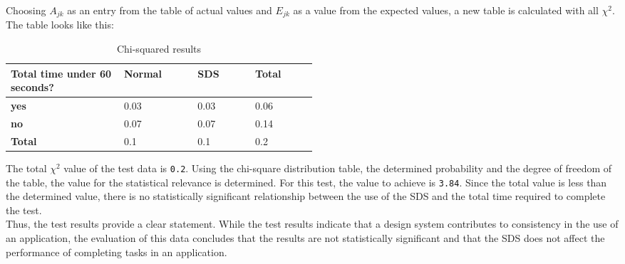 Choosing $A_{jk}$ as an entry from the table of actual values and $E_{jk}$ as a value from the expected values, a new table is calculated with all $\chi^2$. The table looks like this:
\begin{table}[ht]
    \centering
    \begin{tabular}{|p{0.2\linewidth} || p{0.1\linewidth}|p{0.1\linewidth}|p{0.1\linewidth}|}
        \hline
        \textbf{Total time under 60 seconds?} &\textbf{Normal}&\textbf{\ac{SDS}}&\textbf{Total} \\ \hline\hline
        \textbf{yes} & 0.03 & 0.03 & 0.06 \\ \hline
        \textbf{no} & 0.07 & 0.07 & 0.14 \\ \hline
        \textbf{Total} & 0.1 & 0.1 & 0.2 \\ \hline
    \end{tabular}
    \caption{\label{tab:chi-square-results} Chi-squared results}
\end{table}
The total $\chi^2$ value of the test data is \texttt{0.2}. Using the chi-square distribution table, the determined probability and the degree of freedom of the table, the value for the statistical relevance is determined. For this test, the value to achieve is \texttt{3.84}. Since the total value is less than the determined value, there is no statistically significant relationship between the use of the SDS and the total time required to complete the test. \\

Thus, the test results provide a clear statement. While the test results indicate that a design system contributes to consistency in the use of an application, the evaluation of this data concludes that the results are not statistically significant and that the SDS does not affect the performance of completing tasks in an application.